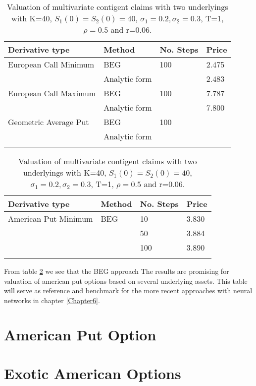 \begin{table}[th]
\caption{Valuation of multivariate contigent claims with two underlyings with K=40, $S_1(0)=S_2(0)=40$, $\sigma_1=0.2, \sigma_2=0.3$, T=1, $\rho=0.5$  and r=0.06.}
\label{tab:PriceEuropean}
\centering
\begin{tabular}{l l l l}
\toprule
\textbf{Derivative type} & \textbf{Method} & \textbf{No. Steps} & \textbf{Price} \\
\midrule
European Call Minimum & BEG & 100 & 2.475\\
& Analytic form & & 2.483\\
European Call Maximum & BEG & 100 & 7.787\\
& Analytic form & & 7.800\\
Geometric Average Put & BEG & 100 & \\
& Analytic form & & \\
\bottomrule\\
\end{tabular}
\end{table}

\begin{table}[th]
\caption{Valuation of multivariate contigent claims with two underlyings with K=40, $S_1(0)=S_2(0)=40$, $\sigma_1=0.2, \sigma_2=0.3$, T=1, $\rho=0.5$  and r=0.06.}
\label{tab:multidimTree}
\centering
\begin{tabular}{l l l l}
\toprule
\textbf{Derivative type} & \textbf{Method} & \textbf{No. Steps} & \textbf{Price} \\
\midrule
American Put Minimum & BEG & 10 & 3.830\\
 &  & 50 & 3.884\\
 &  & 100 & 3.890\\
\bottomrule\\
\end{tabular}
\end{table}

From table \ref{tab:multidimTree} we see that the BEG approach  The results are promising for valuation of american put options based on several underlying assets. This table will serve as reference and benchmark for the more recent approaches with neural networks in chapter \ref{Chapter6}.


\section{American Put Option}

\section{Exotic American Options}


